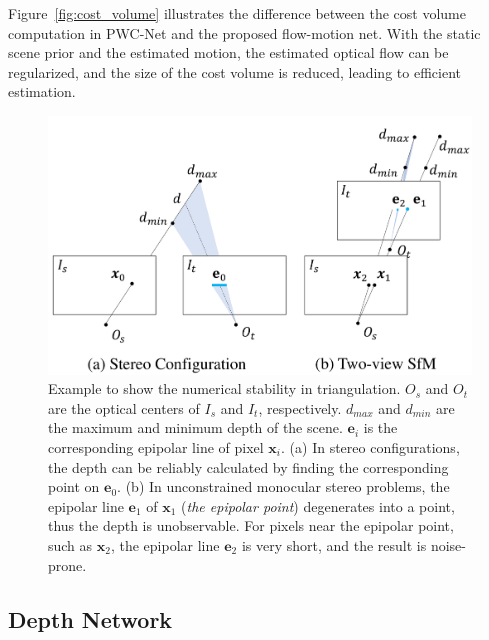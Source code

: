 \documentclass[letterpaper, 10 pt, conference]{ieeeconf}  %
\begin{document}
Figure~\ref{fig:cost_volume} illustrates the difference between the cost volume computation in PWC-Net and the proposed flow-motion net. With the static scene prior and the estimated motion, the estimated optical flow can be regularized, and the size of the cost volume is reduced, leading to efficient estimation.
 
\begin{figure}[t]
\begin{center}
\includegraphics[width=0.9\linewidth]{figs/degenerate_example.pdf}
\end{center}
\vspace{-0.5cm}
\caption{Example to show the numerical stability in triangulation. $O_s$ and $O_t$ are the optical centers of $I_s$ and $I_t$, respectively. $d_{max}$ and $d_{min}$ are the maximum and minimum depth of the scene. $\mathbf{e}_i$ is the corresponding epipolar line of pixel $\mathbf{x}_i$. (a) In stereo configurations, the depth can be reliably calculated by finding the corresponding point on $\mathbf{e}_0$. (b) In unconstrained monocular stereo problems, the epipolar line $\mathbf{e}_1$ of $\mathbf{x}_1$ (\textit{the epipolar point}) degenerates into a point, thus the depth is unobservable. For pixels near the epipolar point, such as $\mathbf{x}_2$, the epipolar line $\mathbf{e}_2$ is very short, and the result is noise-prone.}
\label{fig:stereo_vs_mono}
\vspace{-0.5cm}
\end{figure}
 
\subsection{Depth Network}\label{depth_net}
 
\end{document}
